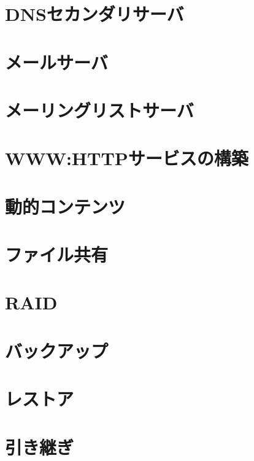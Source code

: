 \documentclass[10pt]{text2002}
\begin{document}
\chapter{DNSセカンダリサーバ}\label{ch:dns2nd}


\chapter{メールサーバ}\label{ch:mail}


\chapter{メーリングリストサーバ}\label{ch:ml}


\chapter{WWW:HTTPサービスの構築}\label{ch:www}


\chapter{動的コンテンツ}\label{ch:dynamic}


\chapter{ファイル共有}\label{ch:share}


\chapter{RAID}


\chapter{バックアップ}


\chapter{レストア}


\chapter{引き継ぎ}

\end{document}
